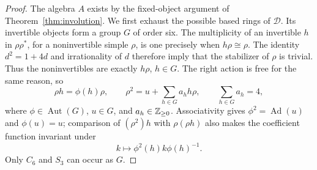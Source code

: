 \begin{proof}
The algebra $A$ exists by the fixed-object argument of
Theorem~\ref{thm:involution}. We first exhaust the possible based rings
of $\mathcal D$. Its invertible objects form a group $G$ of order six.
The multiplicity of an invertible $h$ in $\rho\rho^*$, for a
noninvertible simple $\rho$, is one precisely when $h\rho\cong\rho$.
The identity $d^2=1+4d$ and irrationality of $d$ therefore imply that
the stabilizer of $\rho$ is trivial. Thus the noninvertibles are exactly
$h\rho$, $h\in G$. The right action is free for the same reason, so
\begin{equation}\label{eq:morita-six-relations}
 \rho h=\phi(h)\rho,\qquad
 \rho^2=u+\sum_{h\in G}a_hh\rho,\qquad
 \sum_{h\in G}a_h=4,
\end{equation}
where $\phi\in\operatorname{Aut}(G)$, $u\in G$, and
$a_h\in\mathbb Z_{\ge0}$. Associativity gives
$\phi^2=\operatorname{Ad}(u)$ and $\phi(u)=u$; comparison of
$(\rho^2)h$ with $\rho(\rho h)$ also makes the coefficient function
invariant under
\[
 k\longmapsto\phi^2(h)k\phi(h)^{-1}.
\]
Only $C_6$ and $S_3$ can occur as $G$.


\end{proof}
